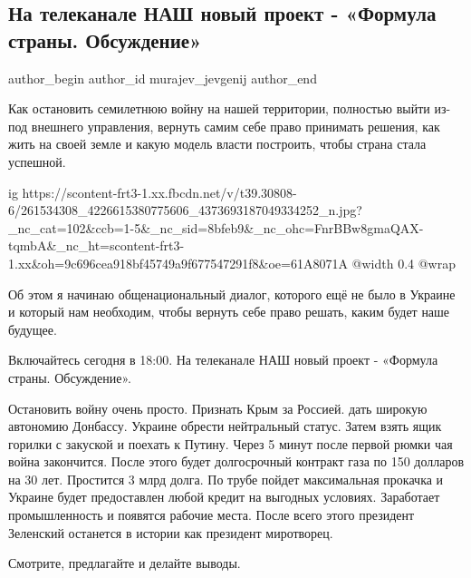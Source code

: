  
 
 
 
 
 
\subsection{На телеканале НАШ новый проект - «Формула страны. Обсуждение»}
\label{sec:26_11_2021.fb.murajev_jevgenij.1.formula_strany}
 
\ifcmt
 author_begin
   author_id murajev_jevgenij
 author_end
\fi

Как остановить семилетнюю войну на нашей территории, полностью выйти из-под
внешнего управления, вернуть самим себе право принимать решения, как жить на
своей земле и какую модель власти построить, чтобы страна стала успешной. 

\ifcmt
  ig https://scontent-frt3-1.xx.fbcdn.net/v/t39.30808-6/261534308_4226615380775606_4373693187049334252_n.jpg?_nc_cat=102&ccb=1-5&_nc_sid=8bfeb9&_nc_ohc=FnrBBw8gmaQAX-tqmbA&_nc_ht=scontent-frt3-1.xx&oh=9c696cea918bf45749a9f677547291f8&oe=61A8071A
  @width 0.4
  @wrap 
\fi

Об этом я начинаю общенациональный диалог, которого ещё не было в Украине и
который нам необходим, чтобы вернуть себе право решать, каким будет наше
будущее. 

Включайтесь сегодня в 18:00. На телеканале НАШ новый проект - «Формула страны.
Обсуждение». 

\begin{cmtfront}

Остановить войну очень просто. Признать Крым за Россией. дать широкую автономию
Донбассу. Украине обрести нейтральный статус. Затем взять ящик горилки с
закуской и поехать к Путину. Через 5 минут после первой рюмки чая война
закончится. После этого будет долгосрочный контракт газа по 150 долларов на 30
лет. Простится 3 млрд долга. По трубе пойдет максимальная прокачка и Украине
будет предоставлен любой кредит на выгодных условиях. Заработает промышленность
и появятся рабочие места. После всего этого президент Зеленский останется в
истории как президент миротворец.	

\end{cmtfront}

Смотрите, предлагайте и делайте выводы.

